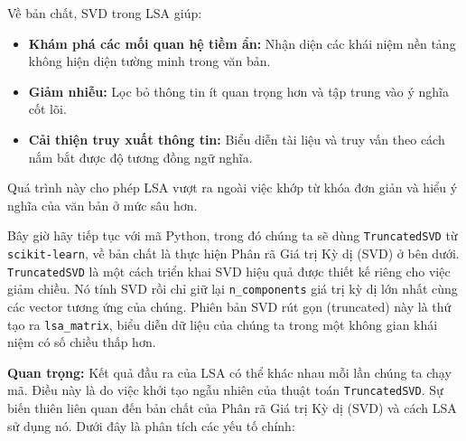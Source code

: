 Về bản chất, SVD trong LSA giúp:

\begin{itemize}
  \item \textbf{Khám phá các mối quan hệ tiềm ẩn:} Nhận diện các khái niệm nền tảng không hiện diện tường minh trong văn bản.
  \item \textbf{Giảm nhiễu:} Lọc bỏ thông tin ít quan trọng hơn và tập trung vào ý nghĩa cốt lõi.
  \item \textbf{Cải thiện truy xuất thông tin:} Biểu diễn tài liệu và truy vấn theo cách nắm bắt được độ tương đồng ngữ nghĩa.
\end{itemize}

Quá trình này cho phép LSA vượt ra ngoài việc khớp từ khóa đơn giản và hiểu ý nghĩa của văn bản ở mức sâu hơn.

Bây giờ hãy tiếp tục với mã Python, trong đó chúng ta sẽ dùng \texttt{TruncatedSVD} từ \texttt{scikit-learn}, về bản chất là thực hiện Phân rã Giá trị Kỳ dị (SVD) ở bên dưới. \texttt{TruncatedSVD} là một cách triển khai SVD hiệu quả được thiết kế riêng cho việc giảm chiều. Nó tính SVD rồi chỉ giữ lại \texttt{n\_components} giá trị kỳ dị lớn nhất cùng các vector tương ứng của chúng. Phiên bản SVD rút gọn (truncated) này là thứ tạo ra \texttt{lsa\_matrix}, biểu diễn dữ liệu của chúng ta trong một không gian khái niệm có số chiều thấp hơn.

\textbf{Quan trọng:} Kết quả đầu ra của LSA có thể khác nhau mỗi lần chúng ta chạy mã. Điều này là do việc khởi tạo ngẫu nhiên của thuật toán \texttt{TruncatedSVD}. Sự biến thiên liên quan đến bản chất của Phân rã Giá trị Kỳ dị (SVD) và cách LSA sử dụng nó. Dưới đây là phân tích các yếu tố chính:

